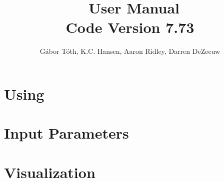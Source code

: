 \documentclass[twoside,10pt]{book}
\title{\BATSRUS\ User Manual \\ \large Code Version 7.73}
\author{G\'abor T\'oth, K.C. Hansen, Aaron Ridley, Darren DeZeeuw}
\begin{document}
\pagestyle{fancy}
\lhead[\fancyplain{}{\bfseries\thepage}]{\fancyplain{}{\bfseries\rightmark}}
\rhead[\fancyplain{}{\bfseries\leftmark}]{\fancyplain{}{\bfseries\thepage}}
\cfoot{}

\maketitle

\tableofcontents



\chapter{Using \BATSRUS \label{chapter:usage}}





\chapter{Input Parameters \label{chapter:param}}






\chapter{Visualization \label{chapter:visualization}}



%
\end{document}
